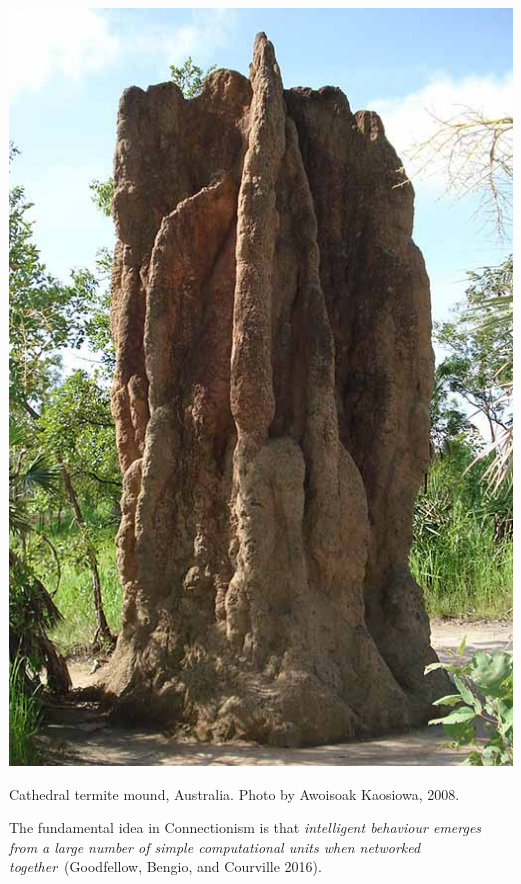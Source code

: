 \documentclass[
  letterpaper,
  12pt,
  british]{tufte-book}
\theoremstyle{plain}
\theoremstyle{plain}
\theoremstyle{definition}
\theoremstyle{remark}
\begin{document}
\begin{marginfigure}

{\centering \includegraphics{Images/termite_cathedral.jpg}

}

\caption{\label{fig-termite}Cathedral termite mound, Australia. Photo by
Awoisoak Kaosiowa, 2008.}

\end{marginfigure}

The fundamental idea in Connectionism is that \emph{intelligent
behaviour emerges from a large number of simple computational units when
networked together}~(Goodfellow, Bengio, and Courville
2016).
\end{document}
